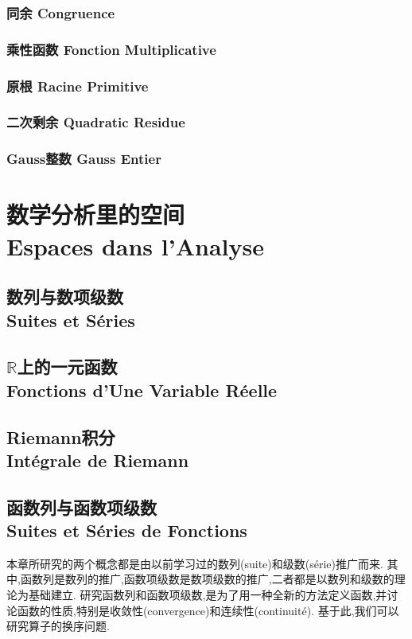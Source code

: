 \documentclass[12pt, a4paper, oneside]{ctexbook}
\newcommand{\R }{\mathbb{R}}%
\begin{document}
  \section{同余 Congruence}
  \section{乘性函数 Fonction Multiplicative}
  \section{原根 Racine Primitive}
  \section{二次剩余 Quadratic Residue}
  \section{Gauss整数 Gauss Entier}


\part{数学分析里的空间\\ Espaces dans l'Analyse}

\chapter{数列与数项级数\\Suites et Séries}

\chapter{$\R$上的一元函数\\ Fonctions d'Une Variable Réelle}

\chapter{Riemann积分\\ Intégrale de Riemann}

\chapter{函数列与函数项级数\\Suites et Séries de Fonctions}
  本章所研究的两个概念都是由以前学习过的数列(suite)和级数(série)推广而来.
  其中,函数列是数列的推广,函数项级数是数项级数的推广,二者都是以数列和级数的理论为基础建立.
  研究函数列和函数项级数,是为了用一种全新的方法定义函数,并讨论函数的性质,特别是收敛性(convergence)和连续性(continuité).
  基于此,我们可以研究算子的换序问题.
\end{document}
